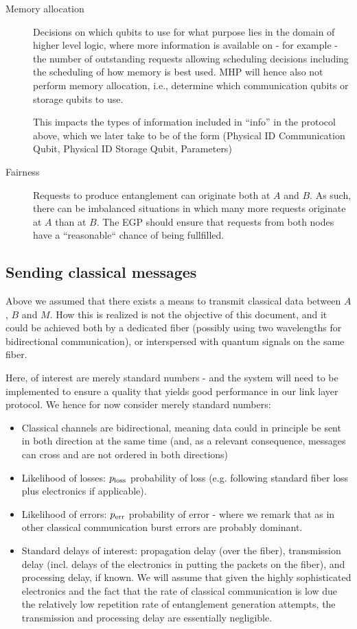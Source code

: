 \documentclass{article}
\begin{document}
\begin{description}
\item[Memory allocation]
Decisions on which qubits to use for what purpose lies in the domain of higher level logic, where more information is available 
on - for example - the number of outstanding requests allowing scheduling decisions including the scheduling of how memory is best used.
MHP will hence also not perform memory allocation, i.e., determine which communication qubits or storage qubits to use. 

This impacts the types of information included in ``info'' in the protocol above, which we later take to be of the form (Physical ID Communication Qubit, Physical ID Storage Qubit, Parameters)

\item[Fairness]
Requests to produce entanglement can originate both at $A$ and $B$. As such, there can be imbalanced situations in which many more requests originate at $A$ than at $B$. The EGP should ensure that requests from both nodes have a ``reasonable`` chance of being fullfilled. 
\end{description}

\subsection{Sending classical messages}\label{sec:classicalMessages}

Above we assumed that there exists a means to transmit classical data between $A$, $B$ and $M$. How this is realized is not the objective of this document, and it could be achieved both by a dedicated fiber (possibly using two wavelengths for bidirectional communication), or interspersed with quantum signals on the same fiber. 

Here, of interest are merely standard numbers - and the system will need to be implemented to ensure a quality that yields good performance in our link layer protocol.
We hence for now consider merely standard numbers: 

\begin{itemize}
\item Classical channels are bidirectional, meaning data could in principle be sent in both direction at the same time (and, as a relevant consequence, messages can cross and are not ordered in both directions)
\item Likelihood of losses: $p_{\rm loss}$ probability of loss (e.g. following standard fiber loss plus electronics if applicable).
\item Likelihood of errors:  $p_{\rm err}$ probability of error - where we remark that as in other classical communication burst errors are probably dominant. 
\item Standard delays of interest: propagation delay (over the fiber), transmission delay (incl. delays of the electronics in putting the packets on the fiber), and processing delay, if known. We will assume that given the highly sophisticated electronics and the fact that the rate of classical communication is low due the relatively low repetition rate of entanglement generation attempts, the transmission and processing delay are essentially negligible.
\end{itemize}
\end{document}
